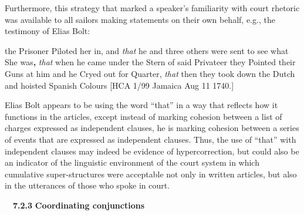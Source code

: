 \begin{styleStandard}
Furthermore, this strategy that marked a speaker’s familiarity with court rhetoric was available to all sailors making statements on their own behalf, e.g., the testimony of Elias Bolt:
\end{styleStandard}

\begin{styleStandard}
the Prisoner Piloted her in, and \textit{that} he and three others were sent to see what She was\textbf{, }\textit{that} when he came under the Stern of said Privateer they Pointed their Guns at him and he Cryed out for Quarter,\textbf{ }\textit{that} then they took down the Dutch and hoisted Spanish Colours [HCA 1/99 Jamaica Aug 11 1740.]
\end{styleStandard}

\begin{styleStandard}
Elias Bolt appears to be using the word “that” in a way that reflects how it functions in the articles, except instead of marking cohesion between a list of charges expressed as independent clauses, he is marking cohesion between a series of events that are expressed as independent clauses. Thus, the use of “that” with independent clauses may indeed be evidence of hypercorrection, but could also be an indicator of the linguistic environment of the court system in which cumulative super-structures were acceptable not only in written articles, but also in the utterances of those who spoke in court. 
\end{styleStandard}

\begin{styleStandard}
\ \ \textbf{7.2.3} \textbf{Coordinating conjunctions }
\end{styleStandard}

